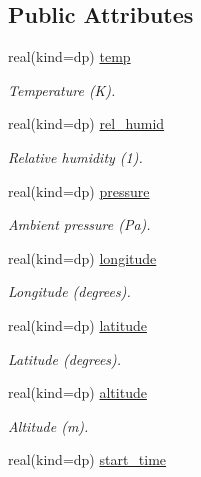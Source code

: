 \subsection*{Public Attributes}
\begin{DoxyCompactItemize}
\item 
real(kind=dp) \mbox{\hyperlink{structpmc__env__state_1_1env__state__t_ad96036a96a84c324f24ff3ceb4874b0d}{temp}}
\begin{DoxyCompactList}\small\item\em Temperature (K). \end{DoxyCompactList}\item 
real(kind=dp) \mbox{\hyperlink{structpmc__env__state_1_1env__state__t_a2427950bdf6ebeff36f51942ffd73c8f}{rel\+\_\+humid}}
\begin{DoxyCompactList}\small\item\em Relative humidity (1). \end{DoxyCompactList}\item 
real(kind=dp) \mbox{\hyperlink{structpmc__env__state_1_1env__state__t_a4544e5d43db7b080a54714d3af9286a5}{pressure}}
\begin{DoxyCompactList}\small\item\em Ambient pressure (Pa). \end{DoxyCompactList}\item 
real(kind=dp) \mbox{\hyperlink{structpmc__env__state_1_1env__state__t_a57752d99573158f173e8ced843f56455}{longitude}}
\begin{DoxyCompactList}\small\item\em Longitude (degrees). \end{DoxyCompactList}\item 
real(kind=dp) \mbox{\hyperlink{structpmc__env__state_1_1env__state__t_a3d2ae4226a160ba39c6e0ccfeaceda75}{latitude}}
\begin{DoxyCompactList}\small\item\em Latitude (degrees). \end{DoxyCompactList}\item 
real(kind=dp) \mbox{\hyperlink{structpmc__env__state_1_1env__state__t_abf793f1fce1aa74bc88374880a8473da}{altitude}}
\begin{DoxyCompactList}\small\item\em Altitude (m). \end{DoxyCompactList}\item 
real(kind=dp) \mbox{\hyperlink{structpmc__env__state_1_1env__state__t_a43c6794a03b478d86902bdc7b52f3d80}{start\+\_\+time}}

\end{DoxyCompactItemize}

